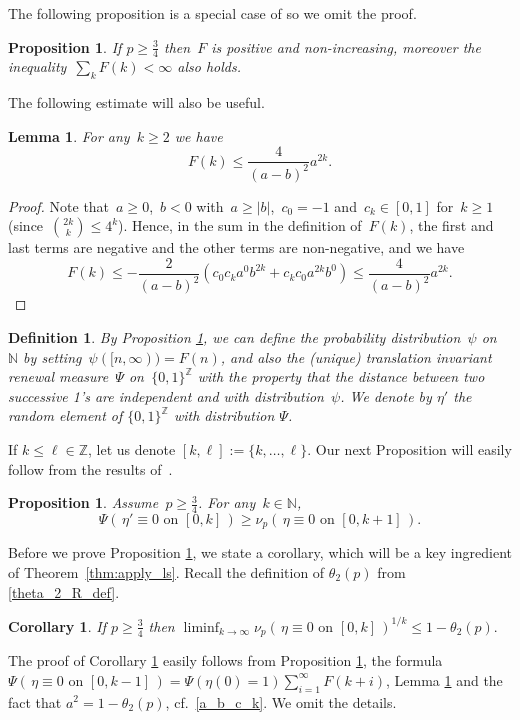 \documentclass[a4paper,12pt]{article}
\newtheorem  {lemma}         [theorem]{Lemma}
\newtheorem  {corollary}     [theorem]{Corollary}
\newtheorem  {proposition}   [theorem]{Proposition}
\newtheorem  {definition}    [theorem]{Definition}
\newcommand{\Z}{\mathbb{Z}}
\begin{document}
The following proposition is  a special case of \cite[Proposition~2.1]{Li95} so we omit the proof.
\begin{proposition}\label{liggett_formula_F} If
$p \geq \frac{3}{4}$ then~$F$ is positive and non-increasing, moreover the inequality~$\sum_k F(k) < \infty$ also holds.
\end{proposition}


   The following estimate will also be useful.
\begin{lemma}\label{lem:bound_psi} For any~$k \geq 2$ we have
	$$F(k) \leq \frac{4}{(a-b)^2}a^{2k}.$$
\end{lemma}
\begin{proof}
	Note that~$a \geq 0$,~$b < 0$ with~$a \geq |b|$,~$c_0 = -1$ and~$c_k \in [0,1]$ for~$k \geq 1$ (since~${2k\choose k} \leq 4^k$). Hence, in the sum in the definition of~$F(k)$, the first and last terms are negative and the other terms are non-negative, and we have
	$$F(k) \leq -\frac{2}{(a-b)^2} (c_0 c_k a^0 b^{2k} + c_kc_0a^{2k}b^0) \leq \frac{4}{(a-b)^2}a^{2k}.$$
\end{proof}


\begin{definition}\label{def_renew_measure}
 By Proposition \ref{liggett_formula_F},
 we can define the probability distribution~$\psi$  on~$\mathbb{N}$ by setting~$\psi([n,\infty)) = F(n)$, and also the (unique) translation invariant renewal measure~$\Psi$ on~$\{0,1\}^\Z$ with the property that the distance between two successive 1's are independent and with distribution~$\psi$. We denote by $\eta'$ the
 random element of $\{0,1\}^\Z$ with distribution $\Psi$.
\end{definition}
If $k \leq \ell \in \mathbb{Z}$, let us denote $[k,\ell]:=\{k,\dots,\ell\}$.
 Our next Proposition will easily follow from the results of~\cite{Li95}.
\begin{proposition}\label{prop:ligg_dom}
	Assume~$p \geq \frac{3}{4}$. For any~$k \in \mathbb{N}$,
	$$ \Psi(\, \eta' \equiv 0 \text{ on } [0,k]\, ) \ge \nu_p(\,  \eta \equiv 0 \text{ on }  [0,k+1] \, ) .$$
\end{proposition}
Before we prove Proposition \ref{prop:ligg_dom}, we state a corollary, which will be a key ingredient of Theorem~\ref{thm:apply_ls}.
 Recall the definition of $\theta_2(p)$ from \eqref{theta_2_R_def}.
\begin{corollary}\label{corollary_liminf_nu} If $p \geq \frac{3}{4}$ then
$  \liminf_{k \to \infty} \nu_p(\,  \eta \equiv 0 \text{ on }  [0,k] \, )^{1/k} \leq 1-\theta_2(p).$
\end{corollary}
The proof of Corollary \ref{corollary_liminf_nu} easily follows from Proposition \ref{prop:ligg_dom}, the formula $\Psi(\, \eta \equiv 0 \text{ on } [0,k-1]\, )=\Psi( \eta(0)=1 ) \sum_{i=1}^{\infty}F(k+i)$, Lemma \ref{lem:bound_psi}
 and the fact that
$a^2=1-\theta_2(p)$, cf.\ \eqref{a_b_c_k}. We omit the details.
\end{document}
